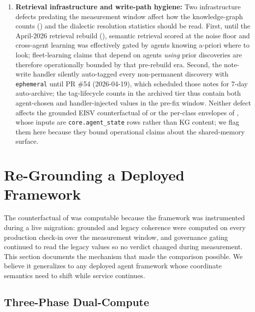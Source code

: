 \documentclass[11pt,twocolumn]{article}
\begin{document}
\begin{enumerate}
  rows rather than the aggregate direction of the per-class envelopes,
  but we have not filtered the counterfactual to post-fix identities;
  a re-measurement on identity-clean data, once sufficient post-fix
  history has accumulated, is deferred to subsequent work.
\item \textbf{Retrieval infrastructure and write-path hygiene:}
  Two infrastructure defects predating the measurement window affect
  how the knowledge-graph counts () and the
  dialectic resolution statistics should be read. First, until the
  April-2026 retrieval rebuild (),
  semantic retrieval scored at the noise floor and cross-agent
  learning was effectively gated by agents knowing a-priori where
  to look; fleet-learning claims that depend on agents
  \emph{using} prior discoveries are therefore operationally bounded
  by that pre-rebuild era. Second, the note-write handler
  silently auto-tagged every non-permanent discovery with
  \texttt{ephemeral} until PR \#54 (2026-04-19), which scheduled
  those notes for 7-day auto-archive; the tag-lifecycle counts in
  the archived tier thus contain both agent-chosen and
  handler-injected values in the pre-fix window. Neither defect
  affects the grounded EISV counterfactual of
   or the per-class envelopes of
  , whose inputs are
  \texttt{core.agent\_state} rows rather than KG content; we flag
  them here because they bound operational claims
  about the shared-memory surface.
\end{enumerate}


\section{Re-Grounding a Deployed Framework}
\label{sec:migration}

The counterfactual of  was
computable because the framework was instrumented during a live
migration: grounded and legacy coherence were computed on every
production check-in over the measurement window, and governance
gating continued to read the legacy values so no verdict changed
during measurement. This section documents the mechanism that
made the comparison possible. We believe it generalizes to any
deployed agent framework whose coordinate semantics need to shift
while service continues.

\subsection{Three-Phase Dual-Compute}
\end{document}
